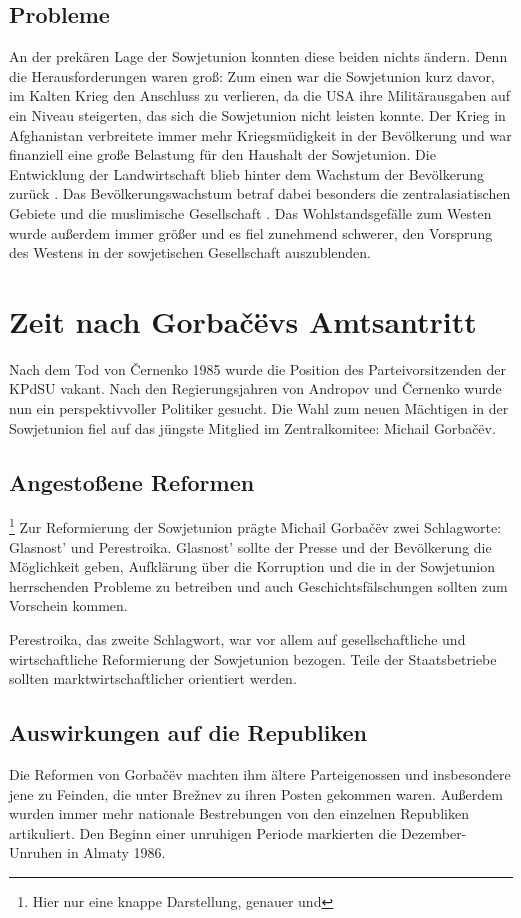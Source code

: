 \documentclass{../../sem_paper}
\begin{document}
\subsection{Probleme}
An der prekären Lage der Sowjetunion konnten diese beiden nichts ändern. Denn die
Herausforderungen waren groß: Zum einen war die Sowjetunion kurz davor, im Kalten
Krieg den Anschluss zu verlieren, da die USA ihre Militärausgaben auf ein Niveau
steigerten, das sich die Sowjetunion nicht leisten konnte. Der Krieg in Afghanistan
verbreitete immer mehr Kriegsmüdigkeit in der Bevölkerung und war finanziell eine
große Belastung für den Haushalt der Sowjetunion. Die Entwicklung der Landwirtschaft
blieb hinter dem Wachstum der Bevölkerung zurück \autocite[117]{kogel2007}. Das Bevölkerungswachstum
betraf dabei besonders die zentralasiatischen Gebiete und die muslimische
Gesellschaft \autocite[47]{zaslav1991} . Das Wohlstandsgefälle zum Westen wurde außerdem immer größer und
es fiel zunehmend schwerer, den Vorsprung des Westens in der sowjetischen
Gesellschaft auszublenden.

\section{Zeit nach Gorbačëvs Amtsantritt}
Nach dem Tod von Černenko 1985 wurde die Position des Parteivorsitzenden der
KPdSU vakant. Nach den Regierungsjahren von Andropov und Černenko
wurde nun ein perspektivvoller Politiker gesucht. Die Wahl zum neuen Mächtigen in der
Sowjetunion fiel auf das jüngste Mitglied im Zentralkomitee: Michail Gorbačëv.

\subsection{Angestoßene Reformen}\footnote{Hier nur eine knappe Darstellung, genauer  und } 
Zur Reformierung der Sowjetunion prägte Michail Gorbačëv zwei Schlagworte: Glasnost' und
Perestroika. Glasnost' sollte der Presse und der Bevölkerung die Möglichkeit geben, Aufklärung
über die Korruption und die in der Sowjetunion herrschenden Probleme zu betreiben
und auch Geschichtsfälschungen sollten zum Vorschein kommen.

Perestroika, das zweite Schlagwort, war vor allem auf gesellschaftliche und
wirtschaftliche Reformierung der Sowjetunion bezogen. Teile der Staatsbetriebe sollten
marktwirtschaftlicher orientiert werden.

\subsection{Auswirkungen auf die Republiken}
Die Reformen von Gorbačëv machten ihm ältere Parteigenossen und insbesondere
jene zu Feinden, die unter Brežnev zu ihren Posten gekommen waren. Außerdem
wurden immer mehr nationale Bestrebungen von den einzelnen Republiken artikuliert.
Den Beginn einer unruhigen Periode markierten die Dezember-Unruhen in Almaty
1986.
\end{document}
